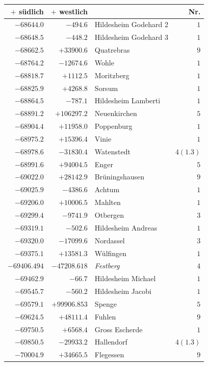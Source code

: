 \clearpage{}%
\begin{center}\begingroup\fontsize{8}{9}\selectfont
\setlength{\tabcolsep}{4pt}
\begin{tabular}{r|r|p{170pt}|r}\hline
\(+\) südlich&\(+\) westlich&&Nr.\\\hline
\(-68644.0\)&\(-494.6\)&Hildesheim Godehard 2&\(1\)\\
\(-68648.5\)&\(-448.2\)&Hildesheim Godehard 3&\(1\)\\
\(-68662.5\)&\(+33900.6\)&Quatrebras&\(9\)\\
\(-68764.2\)&\(-12674.6\)&Wohle&\(1\)\\
\(-68818.7\)&\(+1112.5\)&Moritzberg&\(1\)\\
\(-68825.9\)&\(+4268.8\)&Sorsum&\(1\)\\
\(-68864.5\)&\(-787.1\)&Hildesheim Lamberti&\(1\)\\
\(-68891.2\)&\(+106297.2\)&Neuenkirchen&\(5\)\\
\(-68904.4\)&\(+11958.0\)&Poppenburg&\(1\)\\
\(-68975.2\)&\(+15396.4\)&Vinie&\(1\)\\
\(-68978.6\)&\(-31830.4\)&Watenstedt&\(4(1.3)\)\\
\(-68991.6\)&\(+94004.5\)&Enger&\(5\)\\
\(-69022.0\)&\(+28142.9\)&Brüningshausen&\(9\)\\
\(-69025.9\)&\(-4386.6\)&Achtum&\(1\)\\
\(-69206.0\)&\(+10006.5\)&Mahlten&\(1\)\\
\(-69299.4\)&\(-9741.9\)&Otbergen&\(3\)\\
\(-69319.1\)&\(-502.6\)&Hildesheim Andreas&\(1\)\\
\(-69320.0\)&\(-17099.6\)&Nordassel&\(3\)\\
\(-69375.1\)&\(+13581.3\)&Wülfingen&\(1\)\\
\(-69406.494\)&\(-47208.618\)&\textit{Festberg}&\(4\)\\
\(-69462.9\)&\(-66.7\)&Hildesheim Michael&\(1\)\\
\(-69545.7\)&\(-560.2\)&Hildesheim Jacobi&\(1\)\\
\(-69579.1\)&\(+99906.853\)&Spenge&\(5\)\\
\(-69624.5\)&\(+48111.4\)&Fuhlen&\(9\)\\
\(-69750.5\)&\(+6568.4\)&Gross Escherde&\(1\)\\
\(-69850.5\)&\(-29933.2\)&Hallendorf&\(4(1.3)\)\\
\(-70004.9\)&\(+34665.5\)&Flegessen&\(9\)\\

\end{tabular}
\end{center}
